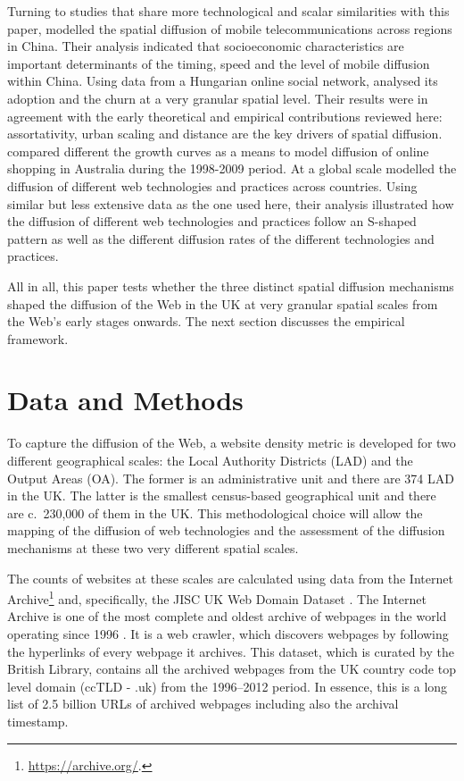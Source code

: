 \documentclass[
  authoryear,
  preprint,
  3p]{elsarticle}
\begin{document}
Turning to studies that share more technological and scalar similarities
with this paper, \citet{ding2010modeling} modelled the spatial diffusion
of mobile telecommunications across regions in China. Their analysis
indicated that socioeconomic characteristics are important determinants
of the timing, speed and the level of mobile diffusion within China.
Using data from a Hungarian online social network,
\citet{lengyel2020role} analysed its adoption and the churn at a very
granular spatial level. Their results were in agreement with the early
theoretical and empirical contributions reviewed here: assortativity,
urban scaling and distance are the key drivers of spatial diffusion.
\citet{bakher2013diffusion} compared different the growth curves as a
means to model diffusion of online shopping in Australia during the
1998-2009 period. At a global scale \citet{PAPAGIANNIDIS2015308}
modelled the diffusion of different web technologies and practices
across countries. Using similar but less extensive data as the one used
here, their analysis illustrated how the diffusion of different web
technologies and practices follow an S-shaped pattern as well as the
different diffusion rates of the different technologies and practices.

All in all, this paper tests whether the three distinct spatial
diffusion mechanisms shaped the diffusion of the Web in the UK at very
granular spatial scales from the Web's early stages onwards. The next
section discusses the empirical framework.

\section{Data and Methods}\label{sec-datamethods}

To capture the diffusion of the Web, a website density metric is
developed for two different geographical scales: the Local Authority
Districts (LAD) and the Output Areas (OA). The former is an
administrative unit and there are 374 LAD in the UK. The latter is the
smallest census-based geographical unit and there are c.~230,000 of them
in the UK. This methodological choice will allow the mapping of the
diffusion of web technologies and the assessment of the diffusion
mechanisms at these two very different spatial scales.

The counts of websites at these scales are calculated using data from
the Internet Archive\footnote{\href{See\%20https://archive.org/}{https://archive.org/}.}
and, specifically, the JISC UK Web Domain Dataset \citep{ukwebarchive}.
The Internet Archive is one of the most complete and oldest archive of
webpages in the world operating since 1996
\citep{ainsworth2011much, holzmann2016dawn}. It is a web crawler, which
discovers webpages by following the hyperlinks of every webpage it
archives. This dataset, which is curated by the British Library,
contains all the archived webpages from the UK country code top level
domain (ccTLD - .uk) from the 1996--2012 period. In essence, this is a
long list of 2.5 billion URLs of archived webpages including also the
archival timestamp.
\end{document}
